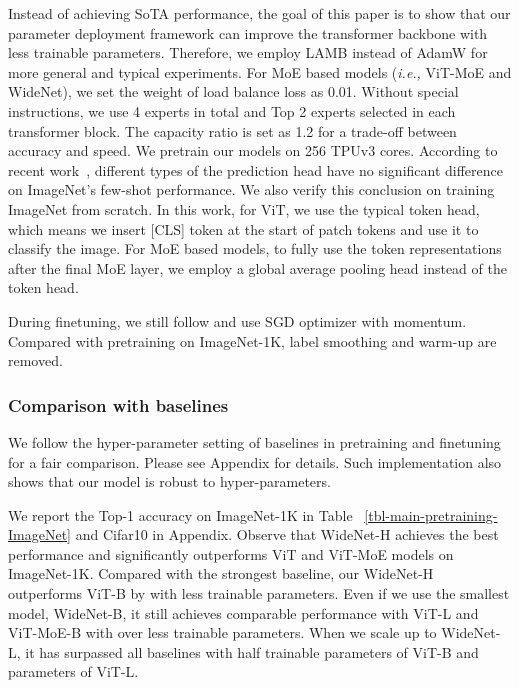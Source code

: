 \documentclass[letterpaper]{article} \usepackage{aaai22}  \usepackage{times}  \usepackage{helvet}  \usepackage{courier}  \usepackage[hyphens]{url}  \usepackage{graphicx} \urlstyle{rm} \def\UrlFont{\rm}  \usepackage{natbib}  \usepackage{caption} \DeclareCaptionStyle{ruled}{labelfont=normalfont,labelsep=colon,strut=off} \frenchspacing  \setlength{\pdfpagewidth}{8.5in}  \setlength{\pdfpageheight}{11in}  \usepackage{algorithm}
\newcommand{\ie}{\emph{i.e.,}\xspace}
\begin{document}
Instead of achieving SoTA performance, the goal of this paper is to show that our parameter deployment framework can improve the transformer backbone with less trainable parameters. Therefore, we employ LAMB instead of AdamW for more general and typical experiments. For MoE based models (\ie ViT-MoE and WideNet), we set the weight of load balance loss  as 0.01. Without special instructions, we use 4 experts in total and Top 2 experts selected in each transformer block. The capacity ratio  is set as 1.2 for a trade-off between accuracy and speed. We pretrain our models on 256 TPUv3 cores. According to recent work~\citep{zhai2021scaling}, different types of the prediction head have no significant difference on ImageNet's few-shot performance. We also verify this conclusion on training ImageNet from scratch. In this work, for ViT, we use the typical token head, which means we insert [CLS] token at the start of patch tokens and use it to classify the image. For MoE based models, to fully use the token representations after the final MoE layer, we employ a global average pooling head instead of the token head. 

During finetuning, we still follow \cite{dosovitskiy2020image} and use SGD optimizer with momentum. Compared with pretraining on ImageNet-1K, label smoothing and warm-up are removed. 







\subsubsection{Comparison with baselines}



We follow the hyper-parameter setting of baselines in pretraining and finetuning for a fair comparison. Please see Appendix for details. Such implementation also shows that our model is robust to hyper-parameters. 












We report the Top-1 accuracy on ImageNet-1K in Table ~\ref{tbl-main-pretraining-ImageNet} and Cifar10 in Appendix. Observe that WideNet-H achieves the best performance and significantly outperforms ViT and ViT-MoE models on ImageNet-1K. Compared with the strongest baseline, our WideNet-H outperforms ViT-B by  with less trainable parameters. Even if we use the smallest model, WideNet-B, it still achieves comparable performance with ViT-L and ViT-MoE-B with over  less trainable parameters. When we scale up to WideNet-L, it has surpassed all baselines with half trainable parameters of ViT-B and  parameters of ViT-L. 
\end{document}
